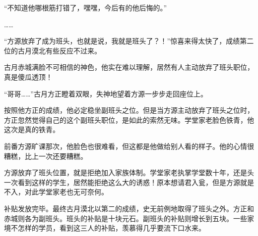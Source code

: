 \begin{this_body}
“不知道他哪根筋打错了，嘿嘿，今后有的他后悔的。”

……

“方源放弃了成为班头，也就是说，我就是班头了？！”惊喜来得太快了，成绩第二位的古月漠北有些反应不过来。

古月赤城满脸不可相信的神色，他实在难以理解，居然有人主动放弃了班头职位，真是傻瓜透顶！

“哥哥……”古月方正瞪着双眼，失神地望着方源一步步走回座位上。

按照他方正的成绩，他必定稳坐副班头之位。但是当方源主动放弃了班头之位时，方正忽然觉得自己的这个副班头职位，是如此的索然无味。学堂家老脸色铁青，他这次是真的铁青。

前番方源旷课那次，他脸色也很难看，但这都是他做给别人看的样子。他的心情很糟糕，比上一次还要糟糕。

方源放弃了班头位置，就是拒绝加入家族体制。学堂家老执掌学堂数十年，还是头一次看到这样的学生，居然能拒绝这么大的诱惑！原本想请君入瓮，但是方源就是不入，对此学堂家老也无可奈何。

补贴发放完毕。最终古月漠北以第二的成绩，史无前例地取得了班头之外。方正和赤城则各为副班头。班头的补贴是十块元石。副班头的补贴则增长到五块。一些家境不怎样的学员，看到这三人的补贴，羡慕得几乎要流下口水来。

\end{this_body}

